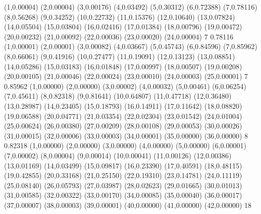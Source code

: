 \newcommand{\serbf}{(0.0122784,0.70) [12\,ms] (0.102719,1.70) [100\,ms] (1.46605,2.70) [1,5\,s] (6.10881,3.70) [6,1\,s]}
\newcommand{\serfw}{(498.743,1.28) [8,3\,min]}
\newcommand{\serfwe}{(31919.6,2.28) [8,9\,h] (3.19196e+07,3.28) [1,0\,ano] (3.19196e+10,4.28) [1.000\,anos]}
\newcommand{\serap}{(38.1392,0.72) [38\,s]}
\newcommand{\serape}{(10421.3,1.72) [2,9\,h] (1.24316e+06,2.72) [14\,dias] (6.45027e+07,3.72) [2,0\,anos]}
\newcommand{\rotulosTempo}{\W{2},\W{3},\W{4},\W{5}}
\expandafter\def\csname ativos@W_2\endcsname{(1,0.00004) (2,0.00004) (3,0.00176) (4,0.03492) (5,0.30312) (6,0.72388) (7,0.78116) (8,0.56268) (9,0.34252) (10,0.22732) (11,0.15376) (12,0.10640) (13,0.07824) (14,0.05504) (15,0.03804) (16,0.02416) (17,0.01384) (18,0.00796) (19,0.00472) (20,0.00232) (21,0.00092) (22,0.00036) (23,0.00020) (24,0.00004)}
\expandafter\def\csname pico@W_2\endcsname{7}
\expandafter\def\csname picoy@W_2\endcsname{0.78116}
\expandafter\def\csname ativos@W_3\endcsname{(1,0.00001) (2,0.00001) (3,0.00082) (4,0.03667) (5,0.45743) (6,0.84596) (7,0.85962) (8,0.66061) (9,0.41916) (10,0.27477) (11,0.19091) (12,0.13123) (13,0.08851) (14,0.05286) (15,0.03183) (16,0.01848) (17,0.00997) (18,0.00507) (19,0.00208) (20,0.00105) (21,0.00046) (22,0.00024) (23,0.00010) (24,0.00003) (25,0.00001)}
\expandafter\def\csname pico@W_3\endcsname{7}
\expandafter\def\csname picoy@W_3\endcsname{0.85962}
\expandafter\def\csname ativos@W_4\endcsname{(1,0.00000) (2,0.00000) (3,0.00002) (4,0.00032) (5,0.00461) (6,0.06254) (7,0.45611) (8,0.82318) (9,0.81641) (10,0.64807) (11,0.47718) (12,0.36480) (13,0.28987) (14,0.23405) (15,0.18793) (16,0.14911) (17,0.11642) (18,0.08820) (19,0.06588) (20,0.04771) (21,0.03354) (22,0.02304) (23,0.01542) (24,0.01004) (25,0.00624) (26,0.00380) (27,0.00209) (28,0.00108) (29,0.00053) (30,0.00026) (31,0.00015) (32,0.00006) (33,0.00003) (34,0.00001) (35,0.00000) (36,0.00000)}
\expandafter\def\csname pico@W_4\endcsname{8}
\expandafter\def\csname picoy@W_4\endcsname{0.82318}
\expandafter\def\csname ativos@W_5\endcsname{(1,0.00000) (2,0.00000) (3,0.00000) (4,0.00000) (5,0.00000) (6,0.00001) (7,0.00002) (8,0.00004) (9,0.00014) (10,0.00041) (11,0.00126) (12,0.00386) (13,0.01169) (14,0.03499) (15,0.09817) (16,0.23390) (17,0.40591) (18,0.48115) (19,0.42855) (20,0.33168) (21,0.25150) (22,0.19310) (23,0.14781) (24,0.11119) (25,0.08140) (26,0.05793) (27,0.03987) (28,0.02623) (29,0.01665) (30,0.01013) (31,0.00585) (32,0.00322) (33,0.00170) (34,0.00085) (35,0.00040) (36,0.00017) (37,0.00007) (38,0.00003) (39,0.00001) (40,0.00000) (41,0.00000) (42,0.00000)}
\expandafter\def\csname pico@W_5\endcsname{18}
